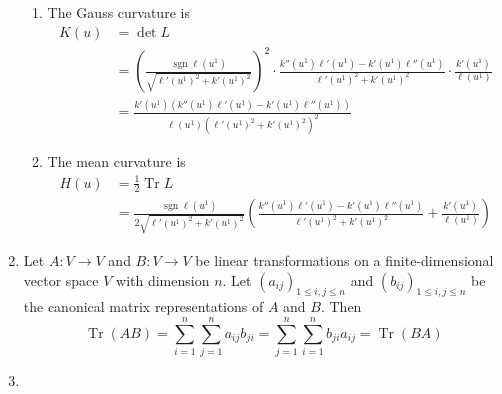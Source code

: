 \documentclass[a4paper, 12pt]{article}
\DeclareMathOperator{\sgn}{sgn}
\DeclareMathOperator{\trace}{Tr}
\begin{document}
\begin{enumerate}
\begin{enumerate}
\item The Gauss curvature is
\begin{align*}
K(u)&=\det L\\
&=\left(\frac{\sgn\ell(u^1)}{\sqrt{\ell'(u^1)^2+k'(u^1)^2}}\right)^2
\cdot\frac{k''(u^1)\ell'(u^1)-k'(u^1)\ell''(u^1)}{\ell'(u^1)^2+k'(u^1)^2}\cdot
\frac{k'(u^1)}{\ell(u^1)}\\
&=\frac{k'(u^1)(k''(u^1)\ell'(u^1)-k'(u^1)\ell''(u^1))}{\ell(u^1)(\ell'(u^1)^2+k'(u^1)^2)^2}
\end{align*}

\item The mean curvature is
\begin{align*}
H(u)&=\frac12\trace L\\
&=\frac{\sgn\ell(u^1)}{2\sqrt{\ell'(u^1)^2+k'(u^1)^2}}\left(
\frac{k''(u^1)\ell'(u^1)-k'(u^1)\ell''(u^1)}{\ell'(u^1)^2+k'(u^1)^2}+
\frac{k'(u^1)}{\ell(u^1)}\right)
\end{align*}

\end{enumerate}

\item Let \(A\colon V\to V\) and \(B\colon V\to V\) be linear transformations on a finite-dimensional vector space \(V\) with dimension \(n\). Let \((a_{ij})_{1\leq i,j\leq n}\) and \((b_{ij})_{1\leq i,j\leq n}\) be the canonical matrix representations of \(A\) and \(B\). Then
\[\trace(AB)=\sum_{i=1}^n\sum_{j=1}^na_{ij}b_{ji}=\sum_{j=1}^n\sum_{i=1}^nb_{ji}a_{ij}=\trace(BA)\]

\item \begin{enumerate}


\end{enumerate}
\end{enumerate}
\end{document}
